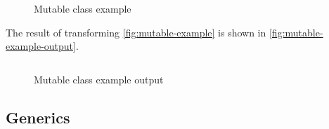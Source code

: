 \documentclass[ oneside,%
                    author={James Elgar},
                    degree={MEng},
                     title={Bidirectional transformer between functional and \\ object-oriented programming in Rust},
                  subtitle={}]{dissertation}
\newcommand{\codefile}[2]{\inputminted[xleftmargin=20pt,linenos, breaklines]{#1}{#2}}
\newcommand{\rustfile}[1]{\codefile{rust}{../#1.rs}}
\newcommand{\rustexample}[1]{\rustfile{examples/src/#1}}
\newcommand{\rustoutput}[1]{\rustfile{outputs/src/#1}}
\begin{document}
\begin{figure}
\centering
\rustexample{mutable/oop_basic}
\caption{Mutable class example}
\label{fig:mutable-example}
\end{figure}

The result of transforming \autoref{fig:mutable-example} is shown in \autoref{fig:mutable-example-output}. 

\begin{figure}
\centering
\rustoutput{mutable/oop_basic}
\caption{Mutable class example output}
\label{fig:mutable-example-output}
\end{figure}

\subsection{Generics}




\end{document}
